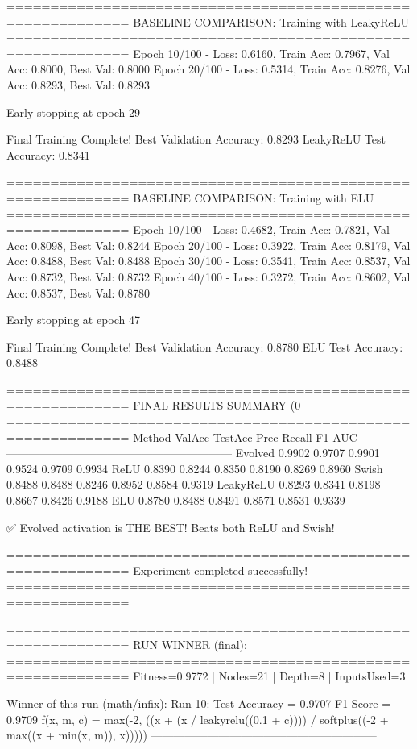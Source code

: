============================================================
BASELINE COMPARISON: Training with LeakyReLU
============================================================
Epoch  10/100 - Loss: 0.6160, Train Acc: 0.7967, Val Acc: 0.8000, Best Val: 0.8000
Epoch  20/100 - Loss: 0.5314, Train Acc: 0.8276, Val Acc: 0.8293, Best Val: 0.8293

Early stopping at epoch 29

Final Training Complete!
Best Validation Accuracy: 0.8293
LeakyReLU Test Accuracy: 0.8341

============================================================
BASELINE COMPARISON: Training with ELU
============================================================
Epoch  10/100 - Loss: 0.4682, Train Acc: 0.7821, Val Acc: 0.8098, Best Val: 0.8244
Epoch  20/100 - Loss: 0.3922, Train Acc: 0.8179, Val Acc: 0.8488, Best Val: 0.8488
Epoch  30/100 - Loss: 0.3541, Train Acc: 0.8537, Val Acc: 0.8732, Best Val: 0.8732
Epoch  40/100 - Loss: 0.3272, Train Acc: 0.8602, Val Acc: 0.8537, Best Val: 0.8780

Early stopping at epoch 47

Final Training Complete!
Best Validation Accuracy: 0.8780
ELU Test Accuracy: 0.8488

============================================================
FINAL RESULTS SUMMARY (0%
============================================================
Method             ValAcc     TestAcc    Prec       Recall     F1         AUC
------------------------------------------------------------
Evolved            0.9902     0.9707     0.9901     0.9524     0.9709     0.9934
ReLU               0.8390     0.8244     0.8350     0.8190     0.8269     0.8960
Swish              0.8488     0.8488     0.8246     0.8952     0.8584     0.9319
LeakyReLU          0.8293     0.8341     0.8198     0.8667     0.8426     0.9188
ELU                0.8780     0.8488     0.8491     0.8571     0.8531     0.9339

✅ Evolved activation is THE BEST! Beats both ReLU and Swish!

============================================================
Experiment completed successfully!
============================================================

============================================================
RUN WINNER (final):
============================================================
Fitness=0.9772 | Nodes=21 | Depth=8 | InputsUsed=3

Winner of this run (math/infix):
  Run 10:
     Test Accuracy = 0.9707
     F1 Score      = 0.9709
     f(x, m, c)    = max(-2, ((x + (x / leakyrelu((0.1 + c)))) / softplus((-2 + max((x + min(x, m)), x)))))
------------------------------------------------------------

